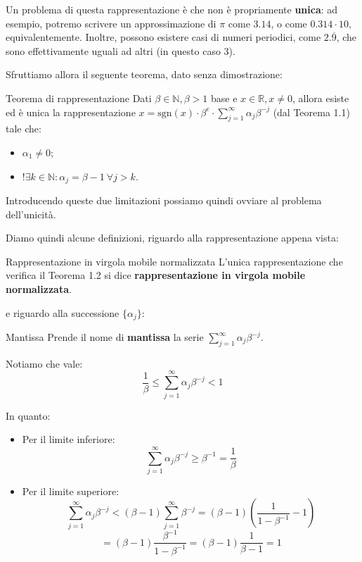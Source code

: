 \documentclass[a4paper,11pt]{article}
\begin{document}
Un problema di questa rappresentazione è che non è propriamente \textbf{unica}: ad esempio, potremo scrivere un approssimazione di $\pi$ come $3.14$, o come $0.314 \cdot 10$, equivalentemente.
Inoltre, possono esistere casi di numeri periodici, come $2.\overline{9}$, che sono effettivamente uguali ad altri (in questo caso $3$).

Sfruttiamo allora il seguente teorema, dato senza dimostrazione:
\begin{theorem}{Teorema di rappresentazione}
	Dati $\beta \in \mathbb{N}, \beta > 1$ base e $x \in \mathbb{R}, x \neq 0$, allora esiste ed è unica la rappresentazione $x = \mathrm{sgn}(x) \cdot \beta^e \cdot \sum_{j=1}^\infty \alpha_j \beta^{-j}$ (dal Teorema 1.1) tale che:
	\begin{itemize}
		\item $\alpha_1 \neq 0$;
		\item $!\exists k \in \mathbb{N} : \alpha_j = \beta - 1 \ \forall j > k$.
	\end{itemize}
\end{theorem}

Introducendo queste due limitazioni possiamo quindi ovviare al problema dell'unicità.

Diamo quindi alcune definizioni, riguardo alla rappresentazione appena vista:

\begin{definition}{Rappresentazione in virgola mobile normalizzata}
	L'unica rappresentazione che verifica il Teorema 1.2 si dice \textbf{rappresentazione in virgola mobile normalizzata}.
\end{definition}

e riguardo alla successione $\{\alpha_j\}$:

\begin{definition}{Mantissa}
	Prende il nome di \textbf{mantissa} la serie $\sum_{j=1}^\infty \alpha_j \beta^{-j}$.
\end{definition}

Notiamo che vale:
$$
\frac{1}{\beta} \leq \sum_{j=1}^\infty \alpha_j \beta^{-j} < 1
$$

In quanto:
\begin{itemize}
	\item Per il limite inferiore: 
		$$
			\sum_{j=1}^\infty \alpha_j \beta^{-j} \geq \beta^{-1} = \frac{1}{\beta}
		$$
	\item Per il limite superiore:
		$$
		\sum_{j=1}^\infty \alpha_j \beta^{-j} < (\beta - 1) \sum_{j=1}^\infty \beta^{-j} = (\beta - 1) \left( \frac{1}{1 - \beta^{-1}} - 1 \right) 
		$$ 
		$$
		= (\beta - 1) \frac{\beta^{-1}}{1-\beta^{-1}} = (\beta - 1) \frac{1}{\beta - 1} = 1
		$$
\end{itemize}
\end{document}
